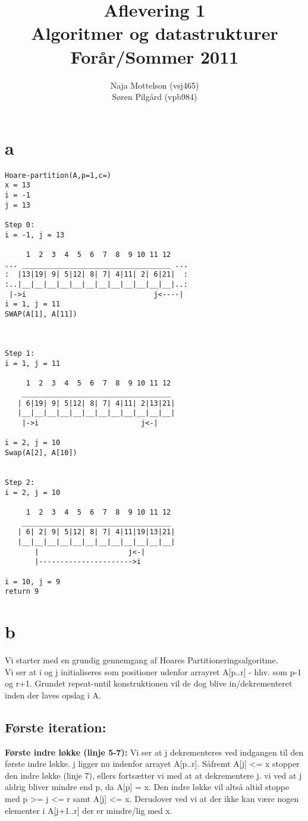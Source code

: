 \documentclass[10pt,a4paper,danish]{article}
\title{Aflevering 1 \\Algoritmer og datastrukturer\\Forår/Sommer 2011}
\author{Naja Mottelson (vsj465)\\Søren Pilgård (vpb984)}
\begin{document}
\maketitle
\newpage

\tableofcontents
\newpage

\section{a}
\begin{verbatim}
Hoare-partition(A,p=1,c=)
x = 13
i = -1
j = 13

Step 0:
i = -1, j = 13

     1  2  3  4  5  6  7  8  9 10 11 12
... ___________________________________ ...
:  |13|19| 9| 5|12| 8| 7| 4|11| 2| 6|21|  :
:..|__|__|__|__|__|__|__|__|__|__|__|__|..:
 |->i                              j<----|
i = 1, j = 11
SWAP(A[1], A[11])



Step 1:
i = 1, j = 11

     1  2  3  4  5  6  7  8  9 10 11 12
    ___________________________________ 
   | 6|19| 9| 5|12| 8| 7| 4|11| 2|13|21|
   |__|__|__|__|__|__|__|__|__|__|__|__|
    |->i                        j<-|

i = 2, j = 10
Swap(A[2], A[10])


Step 2:
i = 2, j = 10

     1  2  3  4  5  6  7  8  9 10 11 12
    ___________________________________ 
   | 6| 2| 9| 5|12| 8| 7| 4|11|19|13|21|
   |__|__|__|__|__|__|__|__|__|__|__|__|
       |                     j<-|
       |---------------------->i

i = 10, j = 9
return 9

\end{verbatim}
\section{b}
Vi starter med en grundig gennemgang af Hoares Partitioneringsalgoritme.
\\

Vi ser at i og j initialiseres som positioner udenfor arrayret A[p..r] - hhv. som p-1 og r+1.
Grundet repeat-until konstruktionen vil de dog blive in/dekrementeret inden der laves opslag i A.

\subsection{Første iteration:}
\label{sec:foerste-it}
\textbf{Første indre løkke (linje 5-7):}
Vi ser at j dekrementeres ved indgangen til den første indre løkke. j ligger nu indenfor arrayet A[p..r]. 
Såfremt A[j] <= x stopper den indre løkke (linje 7), ellers fortsætter vi med at at dekrementere j.
vi ved at j aldrig bliver mindre end p, da A[p] = x. Den indre løkke vil altså altid stoppe med p >= j <= r samt A[j] <= x.
Derudover ved vi at der ikke kan være nogen elementer i A[j+1..r] der er mindre/lig med x.
\\
 
\end{document}
